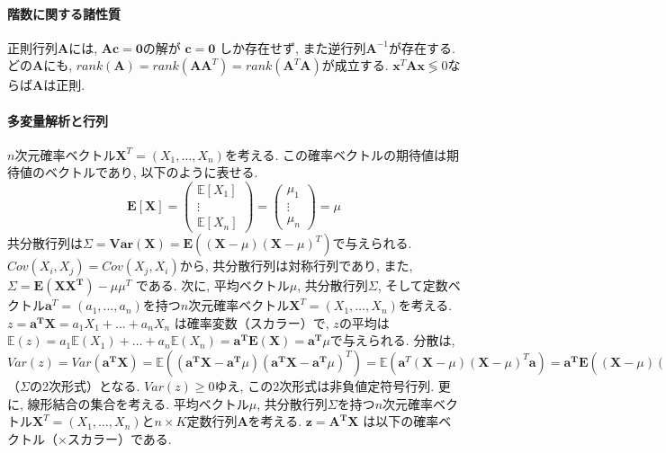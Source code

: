 \documentclass[paper=a4paper,fontsize=10pt]{jlreq}
\begin{document}
\paragraph{階数に関する諸性質}
正則行列$\mathbf{A}$には, $\mathbf{A}\mathbf{c}=\mathbf{0}$の解が $\mathbf{c}=\mathbf{0}$ しか存在せず, また逆行列$\mathbf{A}^{-1}$が存在する. どの$\mathbf{A}$にも, $rank(\mathbf{A})=rank(\mathbf{A}\mathbf{A}^T)=rank(\mathbf{A}^T\mathbf{A})$が成立する. $\mathbf{x}^T\mathbf{A}\mathbf{x}\lessgtr0$ならば$\mathbf{A}$は正則.\\

\paragraph{多変量解析と行列}
$n$次元確率ベクトル$\mathbf{X}^T=(X_1,\dots,X_n)$を考える. この確率ベクトルの期待値は期待値のベクトルであり, 以下のように表せる.
\begin{equation*}
  \mathbf{E[X]} = \begin{pmatrix} \mathbf{\mathbb{E}}[X_1] \\ \vdots \\ \mathbf{\mathbb{E}}[X_n] \end{pmatrix} = \begin{pmatrix} \mu_1 \\ \vdots \\ \mu_n \end{pmatrix} = \mu
\end{equation*}
共分散行列は$\Sigma=\mathbf{Var(X)}=\mathbf{E}((\mathbf{X}-\mu)(\mathbf{X}-\mu)^T)$で与えられる. $Cov(X_i, X_j)=Cov(X_j, X_i)$から, 共分散行列は対称行列であり, また, $\Sigma=\mathbf{E(XX^T)}-{\mu\mu^T}$ である. 次に, 平均ベクトル$\mu$, 共分散行列$\Sigma$, そして定数ベクトル$\mathbf{a}^T=(a_1,\dots,a_n)$を持つ$n$次元確率ベクトル$\mathbf{X}^T=(X_1,\dots,X_n)$を考える. $z=\mathbf{a^T X}=a_1X_1+\dots+a_nX_n$ は確率変数（スカラー）で,  $z$の平均は$\mathbb{E}(z)=a_1\mathbb{E}(X_1)+\dots+a_n\mathbb{E}(X_n)=\mathbf{a^T E(X)}=\mathbf{a^T}\mu$で与えられる. 分散は, $Var(z)=Var(\mathbf{a^T X})=\mathbb{E}((\mathbf{a^T X-a^T} \mu)(\mathbf{a^T X-a^T} \mu)^T)=\mathbb{E}(\mathbf{a}^T (\mathbf{X}-\mu)(\mathbf{X}-\mu)^T \mathbf{a})=\mathbf{a^T}\mathbf{E}({(\mathbf{X}-\mu)(\mathbf{X}-\mu)^T })\mathbf{a}=\mathbf{a^T}\mathbf{Var(X)}\mathbf{a}=\mathbf{a^T} \Sigma \mathbf{a}$（$\Sigma$の2次形式）となる. $Var(z)\geq 0$ゆえ, この2次形式は非負値定符号行列. 更に, 線形結合の集合を考える. 平均ベクトル$\mu$, 共分散行列$\Sigma$を持つ$n$次元確率ベクトル$\mathbf{X}^T=(X_1,\dots,X_n)$と$n\times K$定数行列$\mathbf{A}$を考える. $\mathbf{z}=\mathbf{A^T X}$ は以下の確率ベクトル（×スカラー）である.
\end{document}

